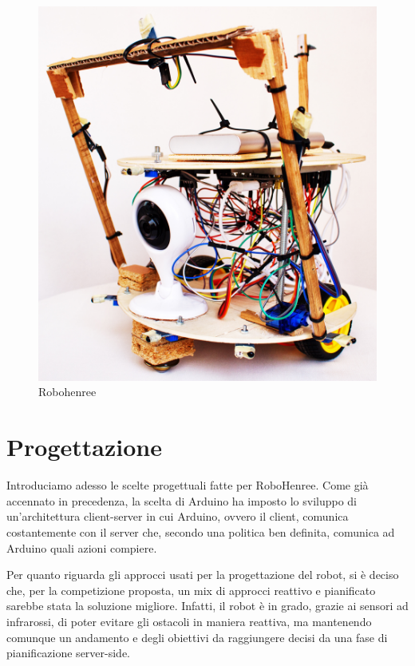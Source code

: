 \documentclass[a4paper,12pt,italian]{article}
\begin{document}
\begin{figure}[H]
\begin{center}
\includegraphics[scale=0.13]{robohenree_2}
\caption{Robohenree}
\label{Fig: robohenree}
\end{center}
\end{figure}

\pagebreak
\section{Progettazione}
Introduciamo adesso le scelte progettuali fatte per RoboHenree. Come già accennato in precedenza, la scelta di Arduino ha imposto lo sviluppo di un'architettura client-server in cui Arduino, ovvero il client, comunica costantemente con il server che, secondo una politica ben definita, comunica ad Arduino quali azioni compiere. 

Per quanto riguarda gli approcci usati per la progettazione del robot, si è deciso che, per la competizione proposta, un mix di approcci reattivo e pianificato sarebbe stata la soluzione migliore. Infatti, il robot è in grado, grazie ai sensori ad infrarossi, di poter evitare gli ostacoli in maniera reattiva, ma mantenendo comunque un andamento e degli obiettivi da raggiungere decisi da una fase di pianificazione server-side.
\end{document}
